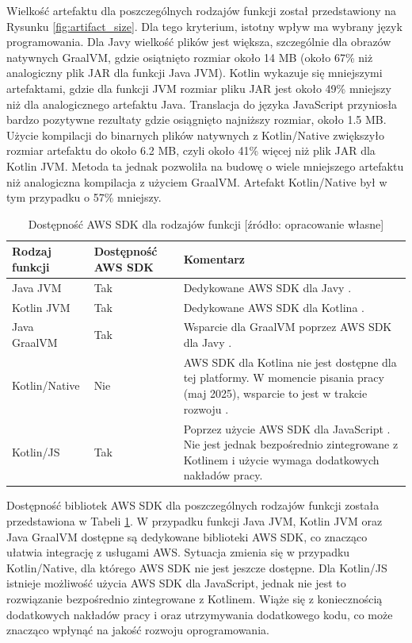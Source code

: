 Wielkość artefaktu dla poszczególnych rodzajów funkcji został przedstawiony na Rysunku \ref{fig:artifact_size}.
Dla tego kryterium, istotny wpływ ma wybrany język programowania.
Dla Javy wielkość plików jest większa, szczególnie dla obrazów natywnych GraalVM, gdzie osiątnięto rozmiar około 14 MB (około 67\% niż analogiczny plik JAR dla funkcji Java JVM).
Kotlin wykazuje się mniejszymi artefaktami, gdzie dla funkcji JVM rozmiar pliku JAR jest około 49\% mniejszy niż dla analogicznego artefaktu Java.
Translacja do języka JavaScript przyniosła bardzo pozytywne rezultaty gdzie osiągnięto najniższy rozmiar, około 1.5 MB.
Użycie kompilacji do binarnych plików natywnych z Kotlin/Native zwiększyło rozmiar artefaktu do około 6.2 MB, czyli około 41\% więcej niż plik JAR dla Kotlin JVM.
Metoda ta jednak pozwoliła na budowę o wiele mniejszego artefaktu niż analogiczna kompilacja z użyciem GraalVM.
Artefakt Kotlin/Native był w tym przypadku o 57\% mniejszy.

\begin{table}[!h]
    \caption{Dostępność AWS SDK dla rodzajów funkcji [źródło: opracowanie własne]}
    \centering
    \begin{tabular}{|p{3cm}|p{3cm}|p{7cm}|} %
    \hline
    \textbf{Rodzaj funkcji} & \textbf{Dostępność AWS SDK} & \textbf{Komentarz} \\
    \hline
    Java JVM & Tak & Dedykowane AWS SDK dla Javy \cite{aws-sdk-java-v2}. \\
    \hline
    Kotlin JVM & Tak & Dedykowane AWS SDK dla Kotlina \cite{aws-sdk-kotlin}. \\
    \hline
    Java GraalVM & Tak & Wsparcie dla GraalVM poprzez AWS SDK dla Javy \cite{aws-sdk-java-v2}. \\
    \hline
    Kotlin/Native & Nie & AWS SDK dla Kotlina nie jest dostępne dla tej platformy. W momencie pisania pracy (maj 2025), wsparcie to jest w trakcie rozwoju \cite{aws-sdk-kotlin}. \\
    \hline
    Kotlin/JS & Tak & Poprzez użycie AWS SDK dla JavaScript \cite{aws-sdk-js-v3}. Nie jest jednak bezpośrednio zintegrowane z Kotlinem i użycie wymaga dodatkowych nakładów pracy. \\
    \hline
    \end{tabular}
    \label{table:aws_sdk_availability}
\end{table}

Dostępność bibliotek AWS SDK dla poszczególnych rodzajów funkcji została przedstawiona w Tabeli \ref{table:aws_sdk_availability}.
W przypadku funkcji Java JVM, Kotlin JVM oraz Java GraalVM dostępne są dedykowane biblioteki AWS SDK, co znacząco ułatwia integrację z usługami AWS. 
Sytuacja zmienia się w przypadku Kotlin/Native, dla którego AWS SDK nie jest jeszcze dostępne. 
Dla Kotlin/JS istnieje możliwość użycia AWS SDK dla JavaScript, jednak nie jest to rozwiązanie bezpośrednio zintegrowane z Kotlinem.
Wiąże się z koniecznością dodatkowych nakładów pracy i oraz utrzymywania dodatkowego kodu, co może znacząco wpłynąć na jakość rozwoju oprogramowania.
